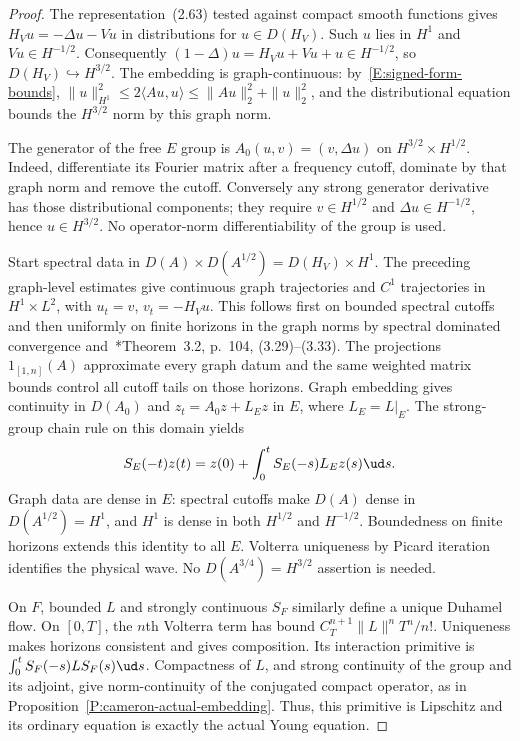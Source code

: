 \begin{proof}
  The representation~(2.63) tested against compact smooth functions
  gives $H_Vu=-\Delta u-Vu$ in distributions for $u\in D(H_V)$.
  Such $u$ lies in $H^1$ and $Vu\in H^{-1/2}$.
  Consequently $(1-\Delta)u=H_Vu+Vu+u\in H^{-1/2}$,
  so $D(H_V)\hookrightarrow H^{3/2}$.
  The embedding is graph-continuous: by~\eqref{E:signed-form-bounds},
  $\|u\|_{H^1}^2\le2\langle Au,u\rangle
  \le\|Au\|_2^2+\|u\|_2^2$, and the distributional equation
  bounds the $H^{3/2}$ norm by this graph norm.

  The generator of the free $E$ group is
  $A_0(u,v)=(v,\Delta u)$ on $H^{3/2}\times H^{1/2}$.
  Indeed, differentiate its Fourier matrix after a frequency cutoff,
  dominate by that graph norm and remove the cutoff.
  Conversely any strong generator derivative has those distributional
  components; they require $v\in H^{1/2}$ and
  $\Delta u\in H^{-1/2}$, hence $u\in H^{3/2}$.
  No operator-norm differentiability of the group is used.

  Start spectral data in $D(A)\times D(A^{1/2})=D(H_V)\times H^1$.
  The preceding graph-level estimates give continuous graph trajectories
  and $C^1$ trajectories in $H^1\times L^2$, with
  $u_t=v$, $v_t=-H_Vu$.
  This follows first on bounded spectral cutoffs and then uniformly
  on finite horizons in the graph norms by spectral dominated
  convergence and~\cite{teschl:14:mathematical}*{Theorem~3.2, p.~104,
  (3.29)--(3.33)}. The projections $1_{[1,n]}(A)$ approximate
  every graph datum and the same weighted matrix bounds control
  all cutoff tails on those horizons.
  Graph embedding gives continuity in $D(A_0)$ and
  $z_t=A_0z+L_Ez$ in $E$, where $L_E=L|_E$.
  The strong-group chain rule on this domain yields
  \[
    S_E(-t)z(t)=z(0)+\int_0^t S_E(-s)L_Ez(s)\ud s .
  \]
  Graph data are dense in $E$: spectral cutoffs make $D(A)$
  dense in $D(A^{1/2})=H^1$, and $H^1$ is dense in both
  $H^{1/2}$ and $H^{-1/2}$.
  Boundedness on finite horizons extends this identity to all $E$.
  Volterra uniqueness by Picard iteration identifies the physical wave.
  No $D(A^{3/4})=H^{3/2}$ assertion is needed.

  On $F$, bounded $L$ and strongly continuous $S_F$ similarly
  define a unique Duhamel flow. On $[0,T]$, the $n$th Volterra
  term has bound $C_T^{n+1}\|L\|^nT^n/n!$.
  Uniqueness makes horizons consistent and gives composition.
  Its interaction primitive is
  $\int_0^t S_F(-s)LS_F(s)\ud s$.
  Compactness of $L$, and strong continuity of the group and
  its adjoint, give norm-continuity of the conjugated compact operator,
  as in Proposition~\ref{P:cameron-actual-embedding}.
  Thus, this primitive is Lipschitz and its ordinary equation is
  exactly the actual Young equation.


\end{proof}
